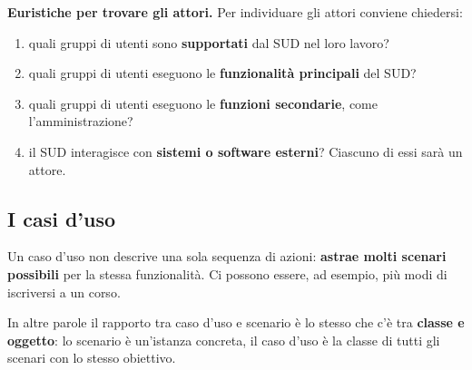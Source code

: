 \textbf{Euristiche per trovare gli attori.} Per individuare gli attori conviene chiedersi:
\begin{enumerate}
  \item quali gruppi di utenti sono \textbf{supportati} dal SUD nel loro lavoro?
  \item quali gruppi di utenti eseguono le \textbf{funzionalità principali} del SUD?
  \item quali gruppi di utenti eseguono le \textbf{funzioni secondarie}, come l'amministrazione?
  \item il SUD interagisce con \textbf{sistemi o software esterni}? Ciascuno di essi sarà un attore.
\end{enumerate}

\subsection{I casi d'uso}


Un caso d'uso non descrive una sola sequenza di azioni: \textbf{astrae molti scenari possibili} per la stessa funzionalità.
Ci possono essere, ad esempio, più modi di iscriversi a un corso.

\begin{center}
\end{center}

In altre parole il rapporto tra caso d'uso e scenario è lo stesso che c'è tra \textbf{classe e oggetto}: lo scenario è
un'istanza concreta, il caso d'uso è la classe di tutti gli scenari con lo stesso obiettivo.

